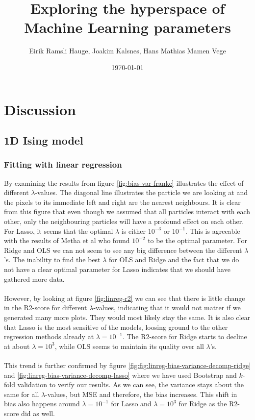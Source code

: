 \documentclass[11pt]{article}
\title{Exploring the hyperspace of Machine Learning parameters}
\author{Eirik Ramsli Hauge, Joakim Kalsnes, Hans Mathias Mamen Vege}
\date{\today}
\begin{document}
\section{Discussion}

\subsection{1D Ising model}
\subsubsection{Fitting with linear regression}
By examining the results from figure \ref{fig:bias-var-franke} illustrates the effect of different $\lambda$-values. The diagonal line illustrates the particle we are looking at and the pixels to its immediate left and right are the nearest neighbours. It is clear from this figure that even though we assumed that all particles interact with each other, only the neighbouring particles will have a profound effect on each other. For Lasso, it seems that the optimal $\lambda$ is either $10^{-3}$ or $10^{-1}$. This is agreeable with the results of Metha et al \cite{2018arXiv180308823M} who found $10^{-2}$ to be the optimal parameter. For Ridge and OLS we can not seem to see any big difference between the different $\lambda$'s. The inability to find the best $\lambda$ for OLS and Ridge and the fact that we do not have a clear optimal parameter for Lasso indicates that we should have gathered more data. \\ \\
However, by looking at figure \ref{fig:linreg-r2} we can see that there is little change in the R2-score for different $\lambda$-values, indicating that it would not matter if we generated many more plots. They would most likely stay the same. It is also clear that Lasso is the most sensitive of the models, loosing ground to the other regression methods already at $\lambda = 10^{-1}$. The R2-score for Ridge starts to decline at about $\lambda = 10^{3}$, while OLS seems to maintain its quality over all $\lambda$'s. \\ \\
This trend is further confirmed by figure \ref{fig:fig:linreg-bias-variance-decomp-ridge} and \ref{fig:linreg-bias-variance-decomp-lasso} where we have used Bootstrap and $k$-fold validation to verify our results. As we can see, the variance stays about the same for all $\lambda$-values, but MSE and therefore, the bias increases. This shift in bias also happens around $\lambda = 10^{-1}$ for Lasso and $\lambda = 10^{3}$ for Ridge as the R2-score did as well.
\end{document}
